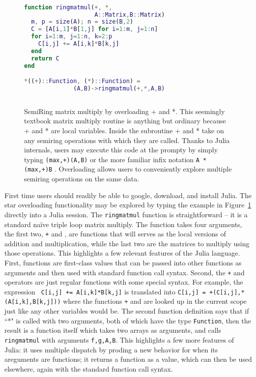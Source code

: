 \documentclass[conference]{IEEEtran}
\begin{document}
\begin{figure}
\begin{lstlisting}[language=matlab, frame=single]

function ringmatmul(+, *, 
                    A::Matrix,B::Matrix)
  m, p = size(A); n = size(B,2)
  C = [A[i,1]*B[1,j] for i=1:m, j=1:n]
  for i=1:m, j=1:n, k=2:p
    C[i,j] += A[i,k]*B[k,j]
  end
  return C
end

*((+)::Function, (*)::Function) = 
              (A,B)->ringmatmul(+,*,A,B)
             
\end{lstlisting}
\label{fig:ringmm}
\caption{SemiRing matrix multiply by overloading + and *.  This seemingly textbook
matrix multiply routine is anything but ordinary because + and * are local variables.  Inside the subroutine + and * take on any semiring operations with which they are called.
Thanks to Julia internals,
users may execute this code at the prompty by simply typing  {\tt *(max,+)(A,B)} or
the more familiar infix notation {\tt A *(max,+)B} . \newline
Overloading allows users to conveniently explore multiple semiring operations on the same data.
}
\end{figure}

First time users should readily be able to google, download, and
install Julia.  The star overloading functionality may be explored by
typing the example in Figure~\ref{fig:ringmm} directly into a Julia
session. The {\tt ringmatmul} function is straightforward -- it is a
standard na\"ive triple loop matrix multiply.  The function takes four
arguments, the first two, {\tt +} and {\tt *}, are functions that will
serves as the local versions of addition and multiplication, while the
last two are the matrices to multiply using those operations.  This
highlights a few relevant features of the Julia language.  First,
functions are first-class values that can be passed into other
functions as arguments and then used with standard function call
syntax.  Second, the {\tt +} and {\tt *} operators are just regular
functions with some special syntax.  For example, the expression {\tt
  C[i,j] += A[i,k]*B[k,j]} is translated into {\tt C[i,j] =
  +(C[i,j],*(A[i,k],B[k,j]))} where the functions {\tt +} and {\tt *}
are looked up in the current scope just like any other variables would
be.  The second function definition says that if ``*" is called with
two arguments, both of which have the type {\tt Function}, then the
result is a function itself which takes two arrays as arguments, and
calls {\tt ringmatmul} with arguments {\tt f,g,A,B}.  This highlights
a few more features of Julia: it uses multiple dispatch by proding a
new behavior for {\tt *} when its areguments are functions; it returns
a function as a value, which can then be used elsewhere, again with
the standard function call syntax.
\end{document}
